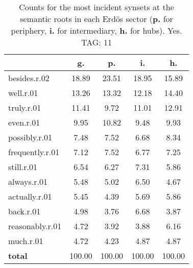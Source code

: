 \begin{table}[h!]
\begin{center}
\begin{tabular}{| l || c | c | c | c |}\hline
 & {\bf g.} & {\bf p.} & {\bf i.} & {\bf h.} \\\hline\hline
besides.r.02 & 18.89  & 23.51  & 18.95  & 15.89 \\\hline
well.r.01 & 13.26  & 13.32  & 12.18  & 14.40 \\\hline
truly.r.01 & 11.41  & 9.72  & 11.01  & 12.91 \\\hline
even.r.01 & 9.95  & 10.82  & 9.48  & 9.93 \\\hline
possibly.r.01 & 7.48  & 7.52  & 6.68  & 8.34 \\\hline
frequently.r.01 & 7.12  & 7.52  & 6.77  & 7.25 \\\hline
still.r.01 & 6.54  & 6.27  & 7.31  & 5.86 \\\hline
always.r.01 & 5.48  & 5.02  & 6.50  & 4.67 \\\hline
actually.r.01 & 5.45  & 4.39  & 5.69  & 5.86 \\\hline
back.r.01 & 4.98  & 3.76  & 6.68  & 3.87 \\\hline
reasonably.r.01 & 4.72  & 3.92  & 3.88  & 6.16 \\\hline
much.r.01 & 4.72  & 4.23  & 4.87  & 4.87 \\\hline\hline
{{\bf total}} & 100.00  & 100.00  & 100.00  & 100.00 \\\hline
\end{tabular}
\caption{Counts for the most incident synsets at the semantic roots in each Erd\"os sector ({\bf p.} for periphery, {\bf i.} for intermediary, {\bf h.} for hubs). Yes. TAG: 11}
\end{center}
\end{table}